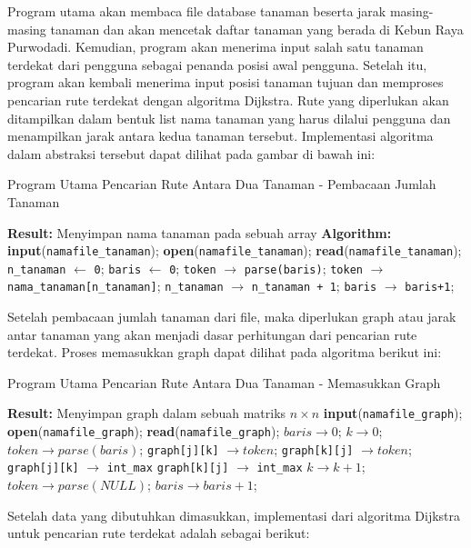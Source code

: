 \documentclass[conference]{IEEEtran}
\begin{document}
Program utama akan membaca file database tanaman beserta jarak masing-masing tanaman dan akan mencetak daftar
tanaman yang berada di Kebun Raya Purwodadi. Kemudian, program akan menerima input salah satu tanaman
terdekat dari pengguna sebagai penanda posisi awal pengguna. Setelah itu, program akan kembali menerima input
posisi tanaman tujuan dan memproses pencarian rute terdekat dengan algoritma Dijkstra. Rute yang diperlukan akan ditampilkan
dalam bentuk list nama tanaman yang harus dilalui pengguna dan menampilkan jarak antara kedua tanaman tersebut.
Implementasi algoritma dalam abstraksi tersebut dapat dilihat pada gambar di bawah ini:

\begin{algorithm}
\caption{Program Utama Pencarian Rute Antara Dua Tanaman - Pembacaan Jumlah Tanaman}
\begin{algorithmic}
\State \textbf{Result:} Menyimpan nama tanaman pada sebuah array
\State \textbf{Algorithm:}
\State \textbf{input}(\texttt{namafile\_tanaman});
\State \textbf{open}(\texttt{namafile\_tanaman});
\State \textbf{read}(\texttt{namafile\_tanaman});
\State \texttt{n\_tanaman} $\leftarrow$ \texttt{0};
\State \texttt{baris} $\leftarrow$ \texttt{0};
\State \texttt{token} $\rightarrow$ \texttt{parse(baris)};
\State \texttt{token} $\rightarrow$ \texttt{nama\_tanaman[n\_tanaman]};
\State \texttt{n\_tanaman} $\rightarrow$ \texttt{n\_tanaman + 1};
\State \texttt{baris} $\rightarrow$ \texttt{baris+1};
\EndWhile
\end{algorithmic}
\end{algorithm}
Setelah pembacaan jumlah tanaman dari file, maka diperlukan graph atau jarak antar tanaman yang akan menjadi dasar
perhitungan dari pencarian rute terdekat. Proses memasukkan graph dapat dilihat pada algoritma berikut ini:
\begin{algorithm}
    \caption{Program Utama Pencarian Rute Antara Dua Tanaman - Memasukkan Graph}
    \begin{algorithmic}
    \State \textbf{Result:} Menyimpan graph dalam sebuah matriks $n \times n$
    \State \textbf{input}(\texttt{namafile\_graph});
    \State \textbf{open}(\texttt{namafile\_graph});
    \State \textbf{read}(\texttt{namafile\_graph});
    \State $baris \rightarrow 0$;
    \State $k \rightarrow 0$;
    \State $token \rightarrow parse(baris)$;
    \State \texttt{graph[j][k]} $\rightarrow token$;
    \State \texttt{graph[k][j]} $\rightarrow token$;
    \State \texttt{graph[j][k]} $\rightarrow$ \texttt{int\_max}
    \State \texttt{graph[k][j]} $\rightarrow$ \texttt{int\_max}
    \Else
    \State $k \rightarrow k + 1$;
    \State $token \rightarrow parse(NULL)$;
    \EndIf
    \EndWhile
    \State $baris \rightarrow baris+1$;
    \EndWhile
    \end{algorithmic}
\end{algorithm}
Setelah data yang dibutuhkan dimasukkan, implementasi dari algoritma Dijkstra untuk pencarian
rute terdekat adalah sebagai berikut:
\end{document}

